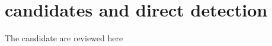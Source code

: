 \label{chapter102}
\chapter{candidates and direct detection}

The candidate are reviewed here\cite{Bertone2005}